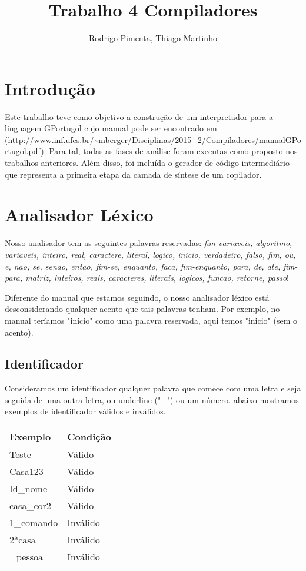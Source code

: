 \documentclass[
12pt,				%
a4paper,			%
english,			%
french,				%
spanish,			%
brazil,				%
article
]{abntex2}
\title{Trabalho 4 Compiladores}
\author{Rodrigo Pimenta, Thiago Martinho}
\begin{document}
\maketitle

\section{Introdução}

Este trabalho teve como objetivo a construção de um interpretador para a linguagem GPortugol cujo manual pode ser encontrado em (\url{http://www.inf.ufes.br/~mberger/Disciplinas/2015_2/Compiladores/manualGPortugol.pdf}). Para tal, todas as fases de análise foram executas como proposto nos trabalhos anteriores. Além disso, foi incluída o gerador de código intermediário que representa a primeira etapa da camada de síntese de um copilador.

\section{Analisador Léxico}
Nosso analisador tem as seguintes palavras reservadas:
\textit{fim-variaveis, algoritmo, variaveis, inteiro, real, caractere, literal, logico, inicio, verdadeiro, falso, fim, ou, e, nao, se, senao, entao, fim-se, enquanto, faca, fim-enquanto, para, de, ate, fim-para, matriz, inteiros, reais, caracteres, literais, logicos, funcao, retorne, passo}!

Diferente do manual que estamos seguindo, o nosso analisador léxico está desconsiderando qualquer acento que tais palavras tenham. Por exemplo, no manual teríamos "início" como uma palavra reservada, aqui temos "inicio" (sem o acento).

\subsection{Identificador}
Consideramos um identificador qualquer palavra que comece com uma letra e seja seguida de uma outra letra, ou underline ("\_") ou um número. abaixo mostramos exemplos de identificador válidos e inválidos.

\begin{center}
	\begin{tabular}{ll}
		\hline Exemplo & Condição  \\
		\hline Teste & Válido \\
		\hline Casa123 & Válido \\
		\hline Id\_nome & Válido \\
		\hline casa\_cor2 & Válido \\
		\hline 1\_comando & Inválido \\
		\hline 2ªcasa & Inválido \\
		\hline \_pessoa & Inválido \\
		\hline
	\end{tabular}
	\label{tab:}
\end{center}
\end{document}
